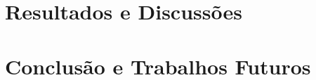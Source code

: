 \chapter{Resultados e Discussões}
\label{cap:resultados}







\chapter{Conclusão e Trabalhos Futuros}
\label{cap:conclusao}




